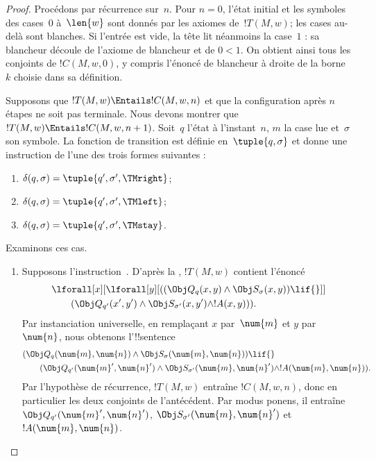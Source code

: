 \documentclass[../../../include/open-logic-section]{subfiles}
\begin{document}
\begin{proof}
Procédons par récurrence sur~$n$. Pour $n=0$, l'état initial et
les symboles des cases~$0$ à~$\len{w}$ sont donnés par les
axiomes de~$!T(M,w)$; les cases au-delà sont blanches. Si
l'entrée est vide, la tête lit néanmoins la case~$1$ : sa
blancheur découle de l'axiome de blancheur et de
$\num{0}<\num{1}$. On obtient ainsi tous les conjoints de
$!C(M,w,0)$, y compris l'énoncé de blancheur à droite de la
borne~$k$ choisie dans sa définition.

Supposons que $!T(M,w)\Entails !C(M,w,n)$ et que la configuration
après $n$ étapes ne soit pas terminale. Nous devons montrer que
$!T(M,w)\Entails !C(M,w,n+1)$. Soit~$q$ l'état à l'instant~$n$,
$m$ la case lue et~$\sigma$ son symbole. La fonction de transition
est définie en~$\tuple{q,\sigma}$ et donne une instruction de
l'une des trois formes suivantes :
\begin{enumerate}
\item {}
  $\delta(q,\sigma)=\tuple{q',\sigma',\TMright}$;
\item {}
  $\delta(q,\sigma)=\tuple{q',\sigma',\TMleft}$;
\item {}
  $\delta(q,\sigma)=\tuple{q',\sigma',\TMstay}$.
\end{enumerate}
Examinons ces cas.

\begin{enumerate}
\item Supposons l'instruction~. D'après
  la , $!T(M,w)$
  contient l'énoncé
\begin{align*}
& \lforall[x][\lforall[y][(
  (\Obj Q_q(x,y)\land\Obj S_\sigma(x,y))\lif {}]]\\
&\qquad (\Obj Q_{q'}(x',y')\land
  \Obj S_{\sigma'}(x,y')\land !A(x,y))).
\end{align*}
  Par instanciation universelle, en remplaçant $x$ par~$\num{m}$
  et $y$ par~$\num{n}$, nous obtenons l'!!{sentence}
\begin{align*}
& (\Obj Q_q(\num{m},\num{n})\land
  \Obj S_\sigma(\num{m},\num{n}))\lif {}\\
&\qquad (\Obj Q_{q'}(\num{m}',\num{n}')\land
  \Obj S_{\sigma'}(\num{m},\num{n}')\land
  !A(\num{m},\num{n})).
\end{align*}
  Par l'hypothèse de récurrence, $!T(M,w)$ entraîne
  $!C(M,w,n)$, donc en particulier les deux conjoints de
  l'antécédent. Par modus ponens, il entraîne
  $\Obj Q_{q'}(\num{m}',\num{n}')$,
  $\Obj S_{\sigma'}(\num{m},\num{n}')$ et
  $!A(\num{m},\num{n})$.


\end{enumerate}
\end{proof}
\end{document}
